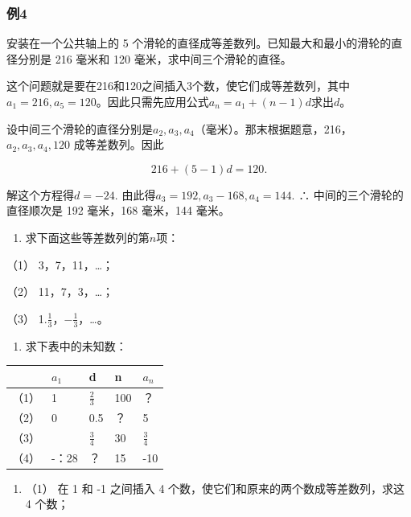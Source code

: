 \subsubsection{例4}

安装在一个公共轴上的 5
个滑轮的直径成等差数列。已知最大和最小的滑轮的直径分别是 216 毫米和 120
毫米，求中间三个滑轮的直径。

这个问题就是要在216和120之间插入3个数，使它们成等差数列，其中\(a_1 = 216, a_5 = 120\)。因此只需先应用公式\(a_n = a_1 + (n - 1)d\)求出\(d\)。

设中间三个滑轮的直径分别是\(a_2, a_3, a_4\)（毫米）。那末根据题意，216，\(a_2, a_3, a_4, 120\)
成等差数列。因此

\[
216 + (5 - 1) d = 120.
\]

解这个方程得\(d = -24.\)
由此得\(a_{3} = 192, a_{3} - 168, a_{4} = 144.\) ∴
中间的三个滑轮的直径顺次是 192 毫米，168 毫米，144 毫米。

\begin{enumerate}
\item
  求下面这些等差数列的第\(n\)项：
\end{enumerate}

（1） 3，7，11，\ldots；

（2） 11，7，3，\ldots；

（3） 1.\(\frac{1}{3}\)，\(-\frac{1}{3}\)，\ldots。

\begin{enumerate}[start=2]
\item
  求下表中的未知数：
\end{enumerate}

{\def\LTcaptype{none} %
\begin{longtable}[]{@{}lllll@{}}
\toprule\noalign{}
& \(a_1\) & d & n & \(a_n\) \\
\midrule\noalign{}
\endhead
\bottomrule\noalign{}
\endlastfoot
（1） & 1 & \(\frac{2}{3}\) & 100 & ？ \\
（2） & 0 & 0.5 & ？ & 5 \\
（3） & & \(\frac{3}{4}\) & 30 & \(\frac{3}{4}\) \\
（4） & -：28 & ？ & 15 & -10 \\
\end{longtable}
}

\begin{enumerate}[start=3]
\item
  （1） 在 1 和 -1 之间插入 4 个数，使它们和原来的两个数成等差数列，求这
  4 个数；
\end{enumerate}

